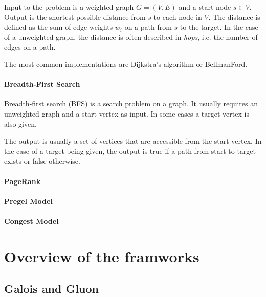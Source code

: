 \documentclass[conference,a4paper]{IEEEtran}
\begin{document}
Input to the problem is a weighted graph $G=(V,E)$ and a start node $s\in V$. Output is the shortest possible distance from $s$ to each node in $V$. 
The distance is defined as the sum of edge weights $w_i$ on a path from $s$ to the target.
In the case of a unweighted graph, the distance is often described in \emph{hops}, i.e. the number of edges on a path.

The most common implementations are Dijkstra's algorithm or BellmanFord.

\paragraph{Breadth-First Search}
Breadth-first search (BFS) is a search problem on a graph. It usually requires an unweighted graph and a start vertex as input. In some cases a target vertex is also given.

The output is usually a set of vertices that are accessible from the start vertex. In the case of a target being given, the output is true if a path from start to target exists or false otherwise.

\paragraph{PageRank}



\paragraph{Pregel Model}




\paragraph{Congest Model}


\section{Overview of the framworks}
\subsection{Galois and Gluon}

\end{document}
